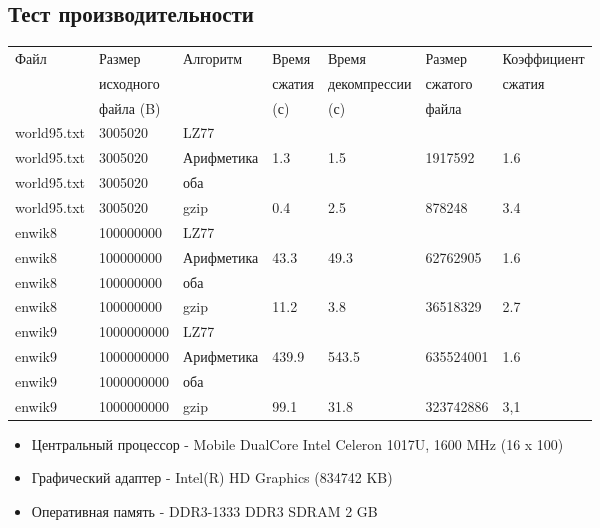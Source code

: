 \documentclass[12pt]{article}
\begin{document}
\subsection*{Тест производительности}%

\noindent
\begin{tabular}{| l | l | l | l | l | l | l |}
	\hline
	Файл             & Размер 	  & Алгоритм   & Время  & Время        & Размер  & Коэффициент \\
	                 & исходного  &            & сжатия & декомпрессии & сжатого & сжатия      \\
	                 & файла (B)  &            & (с)    & (с)          & файла   &             \\
	\hline
	world95.txt      & 3005020    & LZ77       & & & &\\
	\hline
	world95.txt      & 3005020    & Арифметика & 1.3 & 1.5 & 1917592 & 1.6\\
	\hline
	world95.txt      & 3005020    & оба        & & & &\\
	\hline
	world95.txt      & 3005020    & gzip       & 0.4 & 2.5 & 878248 & 3.4\\
	\hline
	enwik8           & 100000000  & LZ77       & & & &\\
	\hline
	enwik8           & 100000000  & Арифметика & 43.3 & 49.3 & 62762905 & 1.6\\
	\hline
	enwik8           & 100000000  & оба        & & & &\\
	\hline
	enwik8           & 100000000  & gzip       & 11.2 & 3.8 & 36518329 & 2.7\\
	\hline
	enwik9           & 1000000000 & LZ77       & & & &\\
	\hline
	enwik9           & 1000000000 & Арифметика & 439.9 & 543.5 & 635524001 & 1.6\\
	\hline
	enwik9           & 1000000000 & оба        & & & &\\
	\hline
	enwik9           & 1000000000 & gzip       & 99.1 & 31.8 & 323742886 & 3,1\\
	\hline
	

\end{tabular}

\begin{itemize}
	\item Центральный процессор - Mobile DualCore Intel Celeron 1017U, 1600 MHz (16 x 100)
	\item Графический адаптер - Intel(R) HD Graphics (834742 KB)
	\item Оперативная память - DDR3-1333 DDR3 SDRAM 2 GB
\end{itemize}
\end{document}
